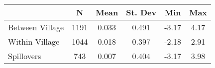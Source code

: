 \begin{tabular}{l*{5}{c}}\hline&\multicolumn{1}{c}{N}&\multicolumn{1}{c}{Mean}&\multicolumn{1}{c}{St. Dev}&\multicolumn{1}{c}{Min}&\multicolumn{1}{c}{Max}\\ \hline 
Between Village & 1191 & 0.033 & 0.491 & -3.17 & 4.17 \\
Within Village & 1044 & 0.018 & 0.397 & -2.18 & 2.91 \\
Spillovers & 743 & 0.007 & 0.404 & -3.17 & 3.98 \\
\hline \end{tabular}
